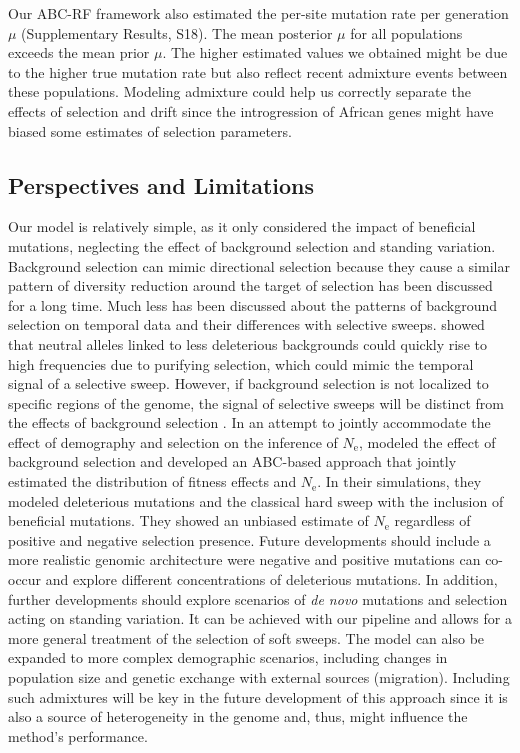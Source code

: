 \documentclass[a4paper, 12pt]{article}
\begin{document}
Our ABC-RF framework also estimated the per-site mutation rate per generation $\mu$ (Supplementary Results, S18). The mean posterior $\mu$ for all populations exceeds the mean prior $\mu$. The higher estimated values we obtained might be due to the higher true mutation rate but also reflect recent admixture events between these populations. Modeling admixture could help us correctly separate the effects of selection and drift since the introgression of African genes might have biased some estimates of selection parameters.

\subsection*{Perspectives and Limitations}

Our model is relatively simple, as it only considered the impact of beneficial mutations, neglecting the effect of background selection and standing variation. Background selection can mimic directional selection because they cause a similar pattern of diversity reduction around the target of selection \citep{Stephan:2010} has been discussed for a long time. Much less has been discussed about the patterns of background selection on temporal data and their differences with selective sweeps. \citet{Cvijovic:2018} showed that neutral alleles linked to less deleterious backgrounds could quickly rise to high frequencies due to purifying selection, which could mimic the temporal signal of a selective sweep. However, if background selection is not localized to specific regions of the genome, the signal of selective sweeps will be distinct from the effects of background selection \citep{Schrider:2020hka}. In an attempt to jointly accommodate the effect of demography and selection on the inference of $N_{\mathrm{e}}$, \citet{Johri:2020ee} modeled the effect of background selection and developed an ABC-based approach that jointly estimated the distribution of fitness effects and $N_{\mathrm{e}}$. In their simulations, they modeled deleterious mutations and the classical hard sweep with the inclusion of beneficial mutations. They showed an unbiased estimate of $N_{\mathrm{e}}$ regardless of positive and negative selection presence. Future developments should include a more realistic genomic architecture were negative and positive mutations can co-occur and explore different concentrations of deleterious mutations. In addition, further developments should explore scenarios of \textit{de novo} mutations and selection acting on standing variation. It can be achieved with our pipeline and allows for a more general treatment of the selection of soft sweeps. The model can also be expanded to more complex demographic scenarios, including changes in population size and genetic exchange with external sources (migration). Including such admixtures will be key in the future development of this approach since it is also a source of heterogeneity in the genome and, thus, might influence the method's performance. 
\end{document}
